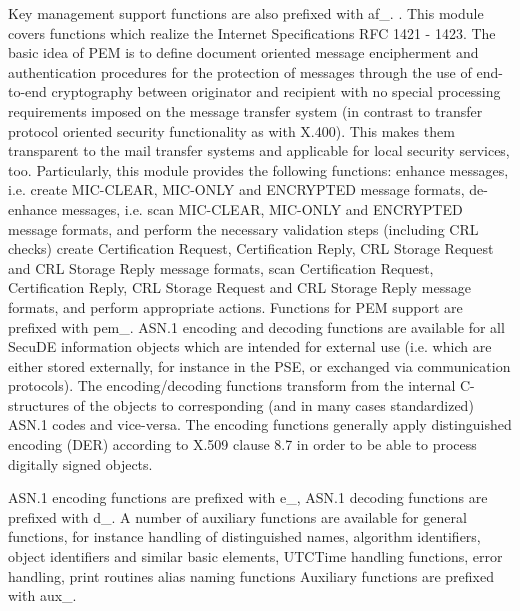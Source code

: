    Key management support functions are also prefixed with af\_. 
. This module covers functions 
   which realize the Internet Specifications RFC 1421 - 1423. 
   The basic idea of PEM is to define document oriented message 
   encipherment and authentication procedures for the protection of 
   messages through the use of 
   end-to-end cryptography between originator and recipient with no special
   processing
   requirements imposed on the message transfer system (in contrast to
   transfer 
   protocol oriented security functionality as with X.400). This makes them
   transparent to the mail 
   transfer systems and applicable for local security services, too. 
   Particularly, this module provides the following functions:
   \bi
   \m enhance messages, i.e. create MIC-CLEAR, MIC-ONLY and
      ENCRYPTED message formats,
   \m de-enhance messages, i.e. scan MIC-CLEAR, MIC-ONLY and
      ENCRYPTED message formats, and perform the necessary
      validation steps (including CRL checks)
   \m create Certification Request, Certification Reply, CRL Storage
      Request and CRL Storage Reply message formats,
   \m scan Certification Request, Certification Reply, CRL Storage
      Request and CRL Storage Reply message formats, and perform
      appropriate actions.
   \ei
   Functions for PEM support are prefixed with pem\_.
   ASN.1 encoding and decoding functions are available 
   for all SecuDE information objects which are intended for external
   use (i.e. which are either stored externally, for instance in the
   PSE, or exchanged via communication protocols). 
   The encoding/decoding functions
   transform from the internal C-structures of the objects to
   corresponding (and in many cases standardized) ASN.1 codes
   and vice-versa. The encoding functions generally apply distinguished encoding 
   (DER) according to X.509 clause 8.7 in order to be able to process 
   digitally signed objects.

   ASN.1 encoding functions are prefixed with e\_, ASN.1 decoding functions 
   are prefixed with d\_.
   A number of auxiliary functions are available for general functions,
   for instance
   \bi
   \m handling of distinguished names, algorithm identifiers, object
      identifiers and similar basic elements,
   \m UTCTime handling functions,
   \m error handling,
   \m print routines
   \m alias naming functions
   \ei
   Auxiliary functions are prefixed with aux\_.
\ei 

